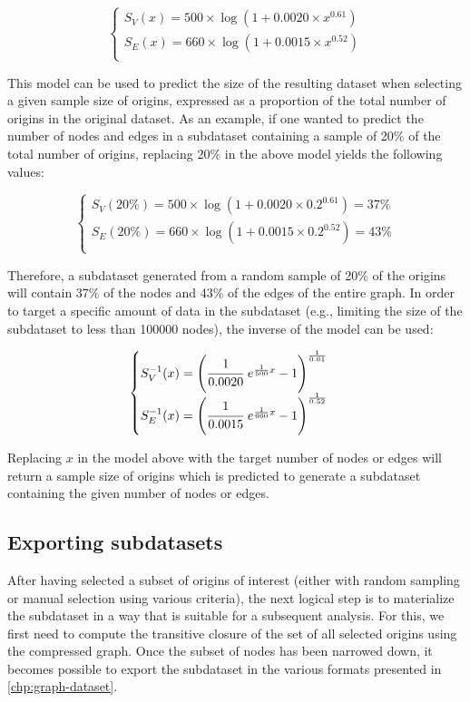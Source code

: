 \[
\begin{cases}
    S_V(x) = 500 \times \log(1 + 0.0020 \times x ^{0.61}) \\
    S_E(x) = 660 \times \log(1 + 0.0015 \times x ^{0.52}) \\
\end{cases}
\]

This model can be used to predict the size of the resulting dataset when
selecting a given sample size of origins, expressed as a proportion of the
total number of origins in the original dataset. As an example, if one wanted
to predict the number of nodes and edges in a subdataset containing a sample of
20\% of the total number of origins, replacing 20\% in the above model
yields the following values:

\[
\begin{cases}
    S_V(20\%) = 500 \times \log(1 + 0.0020 \times 0.2 ^{0.61}) = 37\% \\
    S_E(20\%) = 660 \times \log(1 + 0.0015 \times 0.2 ^{0.52}) = 43\% \\
\end{cases}
\]

Therefore, a subdataset generated from a random sample of 20\% of the origins
will contain 37\% of the nodes and 43\% of the edges of the entire graph.
In order to target a specific amount of data in the subdataset (e.g., limiting
the size of the subdataset to less than \num{100000} nodes), the inverse of the
model can be used:

\[
\begin{cases}
    S_V^{-1}(x) = {\left(\cfrac{1}{0.0020}~e^{\frac{1}{500}x}-1\right)}^{\frac{1}{0.61}} \\
    S_E^{-1}(x) = {\left(\cfrac{1}{0.0015}~e^{\frac{1}{660}x}-1\right)}^{\frac{1}{0.52}} \\
\end{cases}
\]

Replacing $x$ in the model above with the target number of nodes or edges will
return a sample size of origins which is predicted to generate a subdataset
containing the given number of nodes or edges.

\subsection{Exporting subdatasets}

After having selected a subset of origins of interest (either with random
sampling or manual selection using various criteria), the next logical step is
to materialize the subdataset in a way that is suitable for a subsequent
analysis.
For this, we first need to compute the transitive closure of the set of all
selected origins using the compressed graph. Once the subset of nodes has been
narrowed down, it becomes possible to export the subdataset in the various
formats presented in \cref{chp:graph-dataset}.


